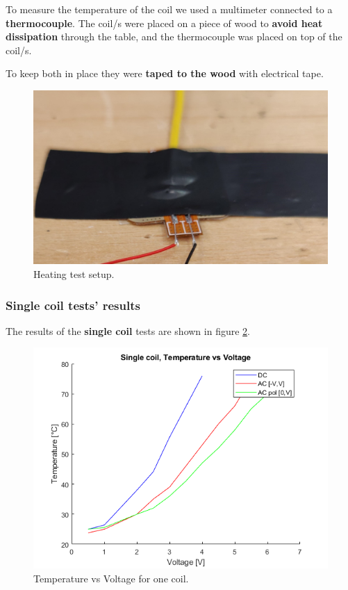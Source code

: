 To measure the temperature of the coil we used a multimeter connected to a \textbf{thermocouple}.
The coil/s were placed on a piece of wood to \textbf{avoid heat dissipation} through the table, and the thermocouple was placed on top of the coil/s.
\begin{samepage}
    To keep both in place they were \textbf{taped to the wood} with electrical tape.
    \nopagebreak

    \begin{figure}[H]
        \centering
        \includegraphics[width = 0.6\linewidth]{Chapters/Chapter5/Exp_Evaluation/Figures/Heating_test_setup.jpg}
        \caption{Heating test setup.}
        \label{fig: Heating_test_setup}
    \end{figure}
\end{samepage}


\subsubsection{Single coil tests' results}
\begin{samepage}
    The results of the \textbf{single coil} tests are shown in figure \ref{fig: Single_coil_heating_tests}.
    \nopagebreak

    \begin{figure}[H]
        \centering
        \includegraphics[width = 0.7\linewidth]{Chapters/Chapter5/Exp_Evaluation/Figures/Temp_vs_Volt_1_coil.png}
        \caption{Temperature vs Voltage for one coil.}
        \label{fig: Single_coil_heating_tests}
    \end{figure}
\end{samepage}

